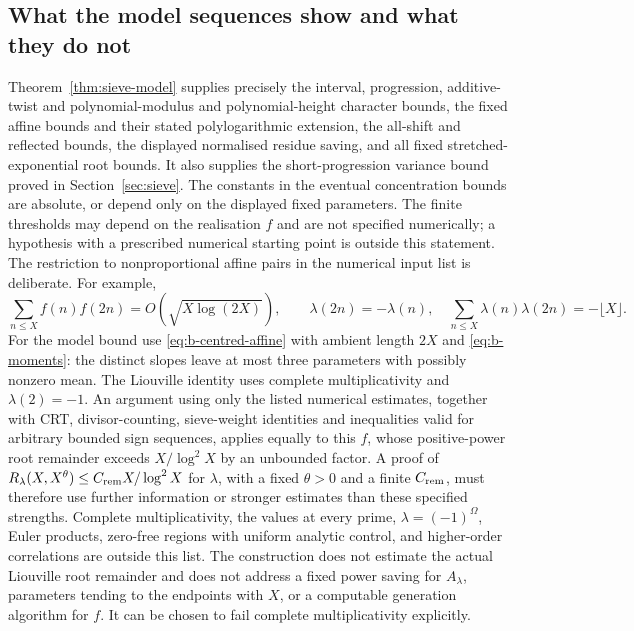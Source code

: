 \documentclass[11pt]{article}
\theoremstyle{definition}
\theoremstyle{remark}
\numberwithin{equation}{section}
\begin{document}
\subsection*{What the model sequences show and what they do not}
Theorem~\ref{thm:sieve-model} supplies precisely the interval, progression, additive-twist and
polynomial-modulus and polynomial-height character bounds, the fixed affine bounds and their stated
polylogarithmic extension, the all-shift and reflected bounds, the displayed normalised residue saving,
and all fixed stretched-exponential root bounds. It also supplies the short-progression variance bound
proved in Section~\ref{sec:sieve}.
The constants in the eventual concentration bounds are absolute, or depend only on the displayed fixed
parameters. The finite thresholds may depend on the realisation $f$ and are not specified numerically;
a hypothesis with a prescribed numerical starting point is outside this statement.
The restriction to nonproportional affine pairs in the numerical input list is deliberate. For example,
\begin{equation}\label{eq:b-proportional-example}
 \sum_{n\le X}f(n)f(2n)=O(\sqrt{X\log(2X)}),\qquad
 \lambda(2n)=-\lambda(n),\quad
 \sum_{n\le X}\lambda(n)\lambda(2n)=-\lfloor X\rfloor.
\end{equation}
For the model bound use \eqref{eq:b-centred-affine} with ambient length $2X$ and
\eqref{eq:b-moments}: the distinct slopes leave at most three parameters with possibly nonzero mean.
The Liouville identity uses complete multiplicativity and $\lambda(2)=-1$.
An argument using only the listed numerical estimates, together with CRT,
divisor-counting, sieve-weight identities and inequalities valid for arbitrary bounded sign sequences,
applies equally to this $f$, whose positive-power root remainder exceeds $X/\log^2X$ by an unbounded
factor. A proof of $R_\lambda(X,X^\theta)\le C_{\rm rem}X/\log^2X$ for $\lambda$, with a fixed $\theta>0$ and a finite
$C_{\rm rem}$, must therefore use further information or stronger estimates than these specified strengths. Complete multiplicativity, the values at every prime, $\lambda=(-1)^\Omega$,
Euler products, zero-free regions with uniform analytic control, and higher-order correlations are outside
this list. The construction does not estimate the actual Liouville root remainder and does not address a
fixed power saving for $A_\lambda$, parameters tending to the endpoints with $X$, or a computable generation
algorithm for $f$. It can be chosen to fail complete multiplicativity explicitly.
\end{document}
